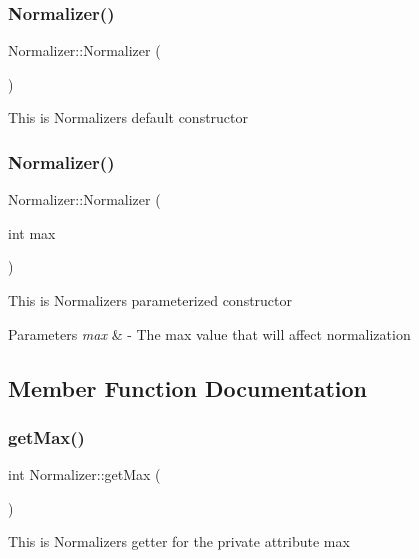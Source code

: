 \subsubsection{\texorpdfstring{Normalizer()}{Normalizer()}\hspace{0.1cm}{\footnotesize\ttfamily [1/2]}}
{\footnotesize\ttfamily Normalizer\+::\+Normalizer (\begin{DoxyParamCaption}{ }\end{DoxyParamCaption})}

This is Normalizers default constructor \mbox{\label{classNormalizer_a5ae90bf733bda279916ef5c05a15d0c1}} 
\subsubsection{\texorpdfstring{Normalizer()}{Normalizer()}\hspace{0.1cm}{\footnotesize\ttfamily [2/2]}}
{\footnotesize\ttfamily Normalizer\+::\+Normalizer (\begin{DoxyParamCaption}\item[{int}]{max }\end{DoxyParamCaption})}

This is Normalizers parameterized constructor 
\begin{DoxyParams}{Parameters}
{\em max} & -\/ The max value that will affect normalization \\
\hline
\end{DoxyParams}


\subsection{Member Function Documentation}
\mbox{\label{classNormalizer_aaa963519038425f08b3b2ca933cd4215}} 
\subsubsection{\texorpdfstring{get\+Max()}{getMax()}}
{\footnotesize\ttfamily int Normalizer\+::get\+Max (\begin{DoxyParamCaption}{ }\end{DoxyParamCaption})}

This is Normalizers getter for the private attribute max \mbox{\label{classNormalizer_a6063bdca1769d4f5dca7d76272344a03}} 
